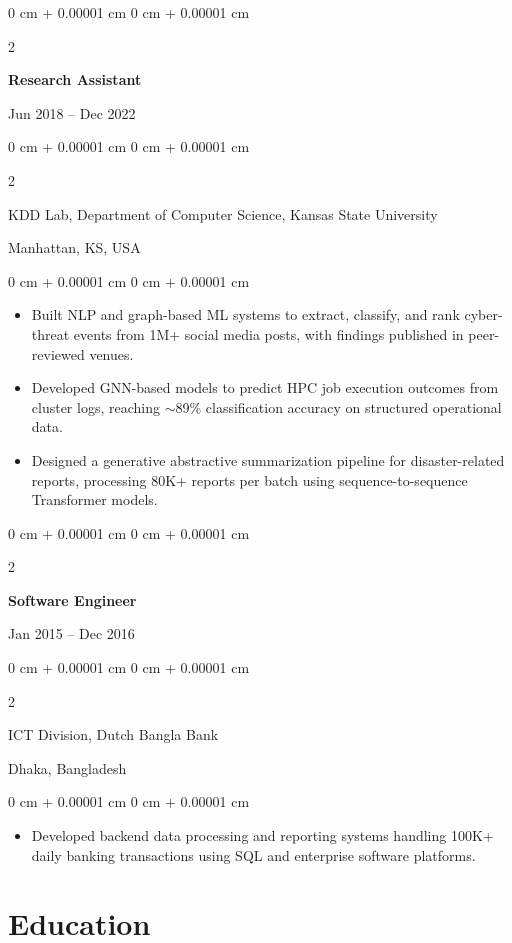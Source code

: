 \documentclass[10pt, letterpaper]{article}
\newenvironment{highlights}{
    \begin{itemize}[
        topsep=0.10 cm,
        parsep=0.10 cm,
        partopsep=0pt,
        itemsep=0pt,
        leftmargin=0 cm + 10pt
    ]
}{
    \end{itemize}
} %
\newenvironment{onecolentry}{
    \begin{adjustwidth}{
        0 cm + 0.00001 cm
    }{
        0 cm + 0.00001 cm
    }
}{
    \end{adjustwidth}
} %
\newenvironment{twocolentry}[2][]{
    \onecolentry
    \def\secondColumn{#2}
    \setcolumnwidth{\fill, 4.5 cm}
    \begin{paracol}{2}
}{
    \switchcolumn \raggedleft \secondColumn
    \end{paracol}
    \endonecolentry
} %
\begin{document}
    \vspace{1mm}

    \begin{twocolentry}{Jun 2018 -- Dec 2022}
        \textbf{Research Assistant}
    \end{twocolentry}
    \begin{twocolentry}{Manhattan, KS, USA}
       KDD Lab, Department of Computer Science, Kansas State University
    \end{twocolentry}
    \vspace{0.10 cm}
    \begin{onecolentry}
        \begin{highlights}
            \item Built NLP and graph-based ML systems to extract, classify, and rank cyber-threat events from 1M+ social media posts, with findings published in peer-reviewed venues.
            \item Developed GNN-based models to predict HPC job execution outcomes from cluster logs, reaching $\sim$89\% classification accuracy on structured operational data.
            \item Designed a generative abstractive summarization pipeline for disaster-related reports, processing 80K+ reports per batch using sequence-to-sequence Transformer models.
        \end{highlights}
    \end{onecolentry}

    \vspace{0.1 cm}
    \begin{twocolentry}{Jan 2015 -- Dec 2016}
        \textbf{Software Engineer}
    \end{twocolentry}
    \begin{twocolentry}{Dhaka, Bangladesh}
       ICT Division, Dutch Bangla Bank
    \end{twocolentry}

    \begin{onecolentry}
        \begin{highlights}
            \item Developed backend data processing and reporting systems handling 100K+ daily banking transactions using SQL and enterprise software platforms.
        \end{highlights}
    \end{onecolentry}

    \section{Education}
\end{document}
